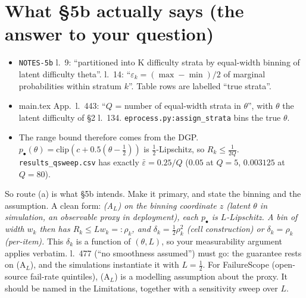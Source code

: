 \documentclass[11pt]{article}
\begin{document}
\section{What \S5b actually says (the answer to your question)}
\begin{itemize}[nosep]
\item \texttt{NOTES-5b} l.~9: ``partitioned into K difficulty strata by equal-width binning of latent difficulty theta''. l.~14: ``$\varepsilon_k=(\max-\min)/2$ of marginal probabilities within stratum $k$''. Table rows are labelled ``true strata''.
\item main.tex App.\ l.~443: ``$Q$ = number of equal-width strata in $\theta$'', with $\theta$ the latent difficulty of \S2 l.~134. \texttt{eprocess.py:assign\_strata} bins the true $\theta$.
\item The range bound therefore comes from the DGP. $p_\bullet(\theta)=\mathrm{clip}(c+0.5(\theta-\frac12))$ is $\frac12$-Lipschitz, so $R_k\le\frac1{2Q}$. \texttt{results\_qsweep.csv} has exactly $\bar\varepsilon=0.25/Q$ ($0.05$ at $Q=5$, $0.003125$ at $Q=80$).
\end{itemize}
So route (a) is what \S5b intends. Make it primary, and state the binning and the assumption. A clean form: \emph{(A$_L$) on the binning coordinate $z$ (latent $\theta$ in simulation, an observable proxy in deployment), each $p_\bullet$ is $L$-Lipschitz. A bin of width $w_k$ then has $R_k\le Lw_k=:\rho_k$, and $\delta_k=\frac12\rho_k^2$ (cell construction) or $\delta_k=\rho_k$ (per-item).} This $\delta_k$ is a function of $(\theta,L)$, so your measurability argument applies verbatim. l.~477 (``no smoothness assumed'') must go: the guarantee rests on (A$_L$), and the simulations instantiate it with $L=\frac12$. For FailureScope (open-source fail-rate quintiles), (A$_L$) is a modelling assumption about the proxy. It should be named in the Limitations, together with a sensitivity sweep over $L$.
\end{document}
